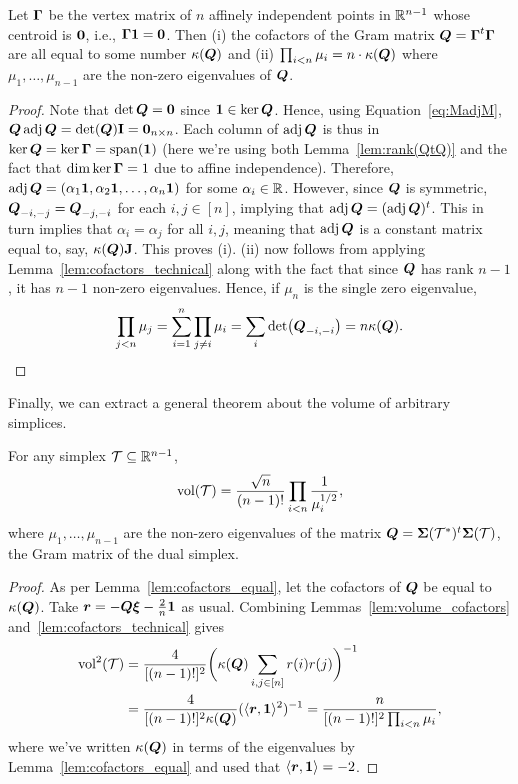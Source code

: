 \begin{lemma}
	\label{lem:cofactors_equal}
	Let $\vb*{\Gamma}$ be the vertex matrix of $n$ affinely independent points in  $\mathbb{R}^{n-1}$ whose  centroid is $\vb{0}$,  i.e., $\vb*{\Gamma}\vb{1}=\vb{0}$. Then (i) the cofactors of the Gram matrix  $\vb*{Q}=\vb*{\Gamma}^t\vb*{\Gamma}$ are all equal to some number $\kappa(\vb*{Q})$ and (ii) $\prod_{i<n}\mu_i = n\cdot \kappa(\vb*{Q})$  where $\mu_1,\dots,\mu_{n-1}$ are the non-zero eigenvalues of $\vb*{Q}$. 
\end{lemma}
\begin{proof}
	Note that $\det\vb*{Q}=\vb{0}$ since  $\vb{1}\in\ker\vb*{Q}$. Hence, using Equation~\eqref{eq:MadjM}, $\vb*{Q}\operatorname{\textnormal{adj}}\vb*{Q} = \det(\vb*{Q})\vb{I}=\vb{0}_{n\times n}$. Each column  of $\operatorname{\textnormal{adj}}\vb*{Q}$ is  thus in $\ker\vb*{Q}=\ker\vb*{\Gamma}=\textnormal{span}(\vb{1})$ (here we're using both  Lemma~\ref{lem:rank(QtQ)} and the fact that $\dim\ker\vb*{\Gamma}=1$ due to affine independence). Therefore, $\operatorname{\textnormal{adj}}\vb*{Q} = (\alpha_1\vb{1},\alpha_2\vb{1},\dots,\alpha_n\vb{1})$ for some $\alpha_i\in\mathbb{R}$. However, since  $\vb*{Q}$ is symmetric, $\vb*{Q}_{-i,-j}=\vb*{Q}_{-j,-i}$ for each $i,j\in[n]$, implying that $\operatorname{\textnormal{adj}}\vb*{Q} = (\operatorname{\textnormal{adj}}\vb*{Q})^t$. This in turn implies that $\alpha_i=\alpha_j$  for all $i,j$, meaning that $\operatorname{\textnormal{adj}}\vb*{Q}$ is a constant matrix equal to, say, $\kappa(\vb*{Q})\vb{J}$. This proves (i). (ii) now follows from applying  Lemma~\ref{lem:cofactors_technical} along with the fact that  since $\vb*{Q}$ has rank $n-1$, it has $n-1$ non-zero eigenvalues. Hence, if $\mu_n$  is the single zero eigenvalue, 
	\begin{equation*}
	\prod_{j<n}\mu_j = \sum_{i=1}^n \prod_{j\neq i}\mu_i = \sum_i \det(\vb*{Q}_{-i,-i}) = n\kappa(\vb*{Q}).\qedhere 
	\end{equation*}
\end{proof}


Finally, we can  extract a general theorem about the volume of arbitrary simplices.  


\begin{theorem}
	\label{thm:simplex_volume}
	For any simplex $\mathcal{T}\subseteq\mathbb{R}^{n-1}$, 
	\begin{equation*}
	\textnormal{vol}(\mathcal{T}) = \frac{\sqrt{n}}{(n-1)!}\prod_{i<n}\frac{1}{\mu_i^{1/2}},
	\end{equation*}
	where $\mu_1,\dots,\mu_{n-1}$ are the non-zero eigenvalues of the matrix   $\vb*{Q}=\boldsymbol{\Sigma}(\mathcal{T}^*)^t\boldsymbol{\Sigma}(\mathcal{T})$, the Gram matrix of the dual simplex. 
\end{theorem}
\begin{proof}
As per Lemma~\ref{lem:cofactors_equal}, let the cofactors of  $\vb*{Q}$ be  equal to $\kappa(\vb*{Q})$. Take  $\vb*{r}=-\vb*{Q}\vb*{\xi}-\frac{2}{n}\vb{1}$  as usual.  
Combining Lemmas~\ref{lem:volume_cofactors} and~\ref{lem:cofactors_technical} gives  
\begin{align*}
\textnormal{vol}^2(\mathcal{T}) &= \frac{4}{[(n-1)!]^2}\bigg(\kappa(\vb*{Q})\sum_{i,j\in[n]} r(i)r(j)\bigg)^{-1} \\
&= \frac{4}{[(n-1)!]^2\kappa(\vb*{Q})}(\langle \vb*{r},\vb{1}\rangle^2)^{-1} = \frac{n}{[(n-1)!]^2\prod_{i<n}\mu_i},
\end{align*}
where we've written $\kappa(\vb*{Q})$ in terms of the eigenvalues by Lemma~\ref{lem:cofactors_equal} and used that $\langle \vb*{r},\vb{1}\rangle = -2$. 
\end{proof}


